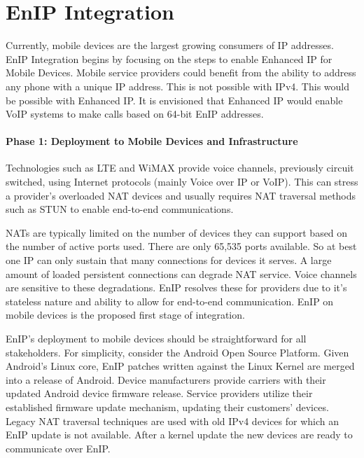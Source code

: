 \section{EnIP Integration}
Currently, mobile devices are the largest growing consumers of IP
addresses.  EnIP Integration begins by focusing on 
the steps to enable Enhanced IP for Mobile Devices.  Mobile service
providers could benefit from the ability to address any phone
with a unique IP address.  This is not possible with IPv4.
This would be possible with Enhanced IP.  It is envisioned that Enhanced
IP would enable VoIP systems to make calls based on 64-bit EnIP
addresses.

\paragraph{Phase 1: Deployment to Mobile Devices and Infrastructure}
Technologies such as LTE and WiMAX provide voice channels, previously
circuit switched, using Internet protocols (mainly Voice over IP or
VoIP).  This can stress a provider's overloaded NAT devices and usually requires
NAT traversal methods such as STUN to enable end-to-end communications.

NATs are typically limited on the number of devices they can
support based on the number of active ports used.  There are
only 65,535 ports available. So at best one IP can only sustain that
many connections for devices it serves.  A large amount of loaded
persistent connections can degrade NAT service.  Voice channels are
sensitive to these degradations.  EnIP resolves these for providers
due to it's stateless nature and ability to allow for end-to-end
communication.  EnIP on mobile devices is the proposed first stage of
integration.

EnIP's deployment to mobile devices should be straightforward
for all stakeholders.  For simplicity, consider the Android Open
Source Platform.  Given Android's Linux core, EnIP patches written
against the Linux Kernel are merged into a release of Android.
Device manufacturers provide carriers with their updated Android
device firmware release.  Service providers utilize their established
firmware update mechanism, updating their customers'
devices.  Legacy NAT traversal techniques are used with old
IPv4 devices for which an EnIP update is not available.  After a kernel
update the new devices are ready to communicate over EnIP.

